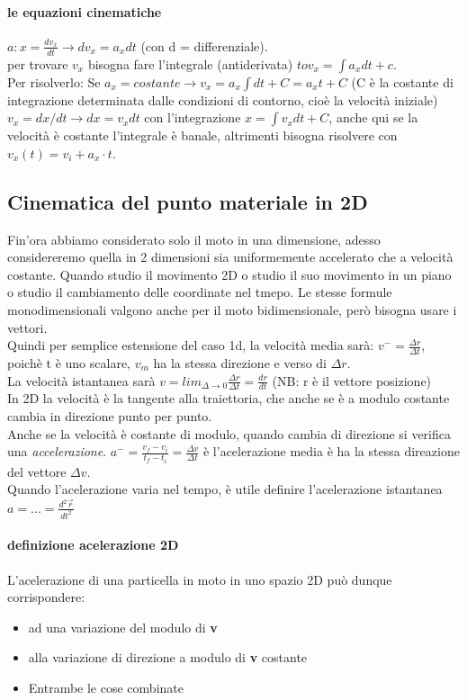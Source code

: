 \documentclass[12pt, a4paper, openany]{book}
\begin{document}
\paragraph*{le equazioni cinematiche} $a:x = \frac{dv_x}{dt} \to dv_x = a_xdt$ (con d = differenziale).
\\per trovare $v_x$ bisogna fare l'integrale (antiderivata) $to v_x = \int a_xdt+c$.
\\Per risolverlo: Se $a_x = costante \to v_x = a_x \int dt + C = a_xt+C$ (C è la costante di integrazione determinata dalle condizioni di contorno, cioè la velocità iniziale)
\\$v_x = dx/dt \to dx=v_xdt$ con l'integrazione $x = \int v_xdt + C$, anche qui se la velocità è costante l'integrale è banale, altrimenti bisogna risolvere con $v_x(t) = v_i + a_x \cdot t$.

\subsection*{Cinematica del punto materiale in 2D}
Fin'ora abbiamo considerato solo il moto in una dimensione, adesso considereremo quella in 2 dimensioni sia uniformemente accelerato che a velocità costante.
Quando studio il movimento 2D o studio il suo movimento in un piano o studio il cambiamento delle coordinate nel tmepo.
Le stesse formule monodimensionali valgono anche per il moto bidimensionale, però bisogna usare i vettori.
\\Quindi per semplice estensione del caso 1d, la velocità media sarà: $v^- = \frac{\Delta r}{\Delta t}$, poichè t è uno scalare, $v_m$ ha la stessa direzione e verso di $\Delta r$.
\\La velocità istantanea sarà $v = lim_{\Delta \to 0 } \frac{\Delta r}{\Delta t} = \frac{dr}{dt}$ (NB: r è il vettore posizione)
\\In 2D la velocità è la tangente alla traiettoria, che anche se è a modulo costante cambia in direzione punto per punto.
\\Anche se la velocità è costante di modulo, quando cambia di direzione si verifica una \emph{accelerazione}.
$a^- = \frac{v_f-v_i}{t_f-t_i}= \frac{\Delta v}{\Delta t}$ è l'acelerazione media è ha la stessa direazione del vettore $\Delta v$.
\\Quando l'acelerazione varia nel tempo, è utile definire l'acelerazione istantanea $a = ... = \frac{d^2 \overrightarrow{r} }{dt^2}$
\paragraph*{definizione acelerazione 2D} L'acelerazione di una particella in moto in uno spazio 2D può dunque corrispondere:
\begin{itemize}
    \item ad una variazione del modulo di \textbf{v}
    \item alla variazione di direzione a modulo di \textbf{v} costante
    \item Entrambe le cose combinate
\end{itemize}
\end{document}
